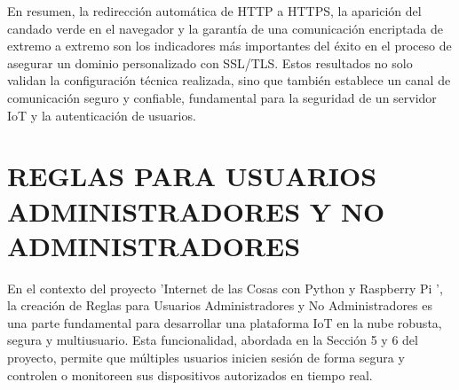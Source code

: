 \documentclass{report}
\begin{document}
En resumen, la redirección automática de HTTP a HTTPS, la aparición del candado verde en el navegador y la garantía de una comunicación 
encriptada de extremo a extremo son los indicadores más importantes del éxito en el proceso de asegurar un dominio personalizado 
con SSL/TLS. Estos resultados no solo validan la configuración técnica realizada, sino que también establece un canal de comunicación 
seguro y confiable, fundamental para la seguridad de un servidor IoT y la autenticación de usuarios.

\chapter{REGLAS PARA USUARIOS ADMINISTRADORES Y NO ADMINISTRADORES}
En el contexto del proyecto  'Internet de las Cosas con Python y Raspberry Pi ', la creación de  Reglas para Usuarios Administradores y No Administradores  
es una parte fundamental para desarrollar una plataforma IoT en la nube robusta, segura y multiusuario. Esta funcionalidad, abordada en la Sección 
5 y 6 del proyecto, permite que múltiples usuarios inicien sesión de forma segura y controlen o monitoreen sus dispositivos autorizados en tiempo real.
\end{document}

